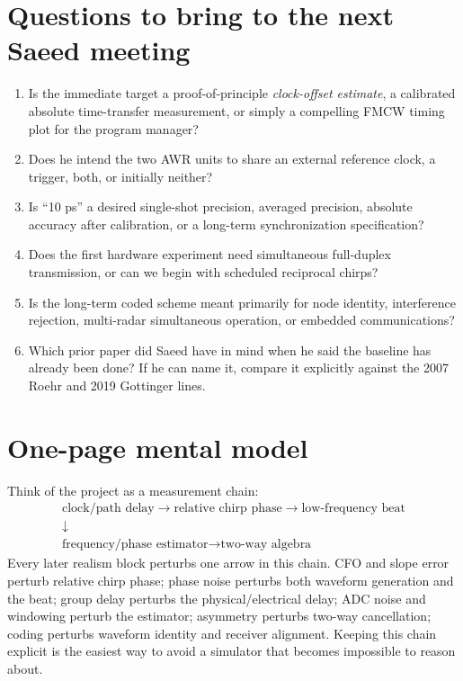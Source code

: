\documentclass[11pt]{article}
\begin{document}
\section{Questions to bring to the next Saeed meeting}
\begin{enumerate}
\item Is the immediate target a proof-of-principle \emph{clock-offset estimate}, a calibrated absolute time-transfer measurement, or simply a compelling FMCW timing plot for the program manager?
\item Does he intend the two AWR units to share an external reference clock, a trigger, both, or initially neither?
\item Is ``10 ps'' a desired single-shot precision, averaged precision, absolute accuracy after calibration, or a long-term synchronization specification?
\item Does the first hardware experiment need simultaneous full-duplex transmission, or can we begin with scheduled reciprocal chirps?
\item Is the long-term coded scheme meant primarily for node identity, interference rejection, multi-radar simultaneous operation, or embedded communications?
\item Which prior paper did Saeed have in mind when he said the baseline has already been done? If he can name it, compare it explicitly against the 2007 Roehr and 2019 Gottinger lines.
\end{enumerate}

\section{One-page mental model}
Think of the project as a measurement chain:
\[
\begin{gathered}
\boxed{\text{clock/path delay}}\rightarrow
\boxed{\text{relative chirp phase}}\rightarrow
\boxed{\text{low-frequency beat}}\\[0.4em]
\downarrow\\[-0.2em]
\boxed{\text{frequency/phase estimator}}\rightarrow
\boxed{\text{two-way algebra}}
\end{gathered}
\]
Every later realism block perturbs one arrow in this chain. CFO and slope error perturb relative chirp phase; phase noise perturbs both waveform generation and the beat; group delay perturbs the physical/electrical delay; ADC noise and windowing perturb the estimator; asymmetry perturbs two-way cancellation; coding perturbs waveform identity and receiver alignment. Keeping this chain explicit is the easiest way to avoid a simulator that becomes impossible to reason about.
\end{document}
